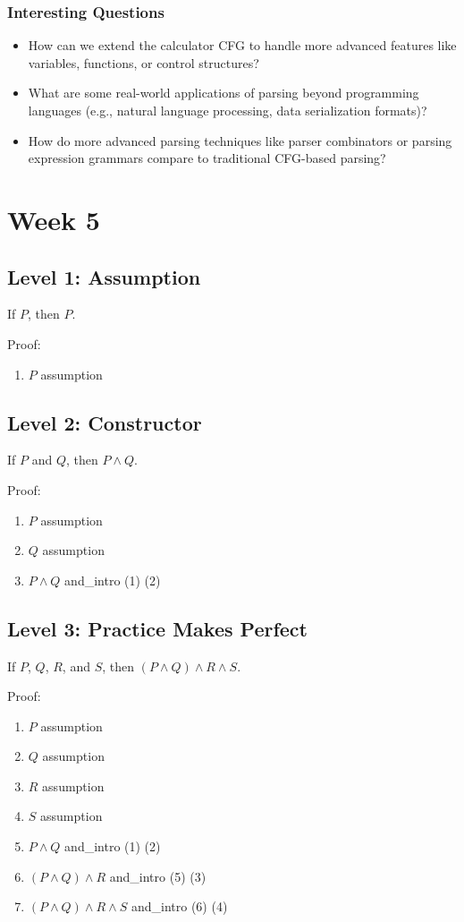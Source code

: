 \documentclass{article}
\theoremstyle{theorem}
\theoremstyle{definition}
\theoremstyle{remark}
\begin{document}
\subsubsection{Interesting Questions}
\begin{itemize}
\item How can we extend the calculator CFG to handle more advanced features like variables, functions, or control structures?
\item What are some real-world applications of parsing beyond programming languages (e.g., natural language processing, data serialization formats)?
\item How do more advanced parsing techniques like parser combinators or parsing expression grammars compare to traditional CFG-based parsing?
\end{itemize}

\section{Week 5}

\subsection{Level 1: Assumption}
If $P$, then $P$.

Proof:
\begin{enumerate}
    \item $P$ \hfill assumption
\end{enumerate}

\subsection{Level 2: Constructor}
If $P$ and $Q$, then $P \wedge Q$.

Proof:
\begin{enumerate}
    \item $P$ \hfill assumption
    \item $Q$ \hfill assumption
    \item $P \wedge Q$ \hfill and\_intro (1) (2)
\end{enumerate}

\subsection{Level 3: Practice Makes Perfect}
If $P$, $Q$, $R$, and $S$, then $(P \wedge Q) \wedge R \wedge S$.

Proof:
\begin{enumerate}
    \item $P$ \hfill assumption
    \item $Q$ \hfill assumption
    \item $R$ \hfill assumption
    \item $S$ \hfill assumption
    \item $P \wedge Q$ \hfill and\_intro (1) (2)
    \item $(P \wedge Q) \wedge R$ \hfill and\_intro (5) (3)
    \item $(P \wedge Q) \wedge R \wedge S$ \hfill and\_intro (6) (4)
\end{enumerate}
\end{document}
